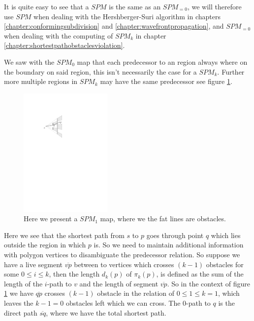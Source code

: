 It is quite easy to see that a $SPM$ is the same as an $SPM_{=0}$, we will therefore use $SPM$ when 
dealing with the Hershberger-Suri algorithm in chapters \ref{chapter:conformingsubdivision} and 
\ref{chapter:wavefrontpropagation}, and $SPM_{=0}$ when dealing with the computing of $SPM_k$ in
chapter \ref{chapter:shortestpathobstaclesviolation}.

We saw with the $SPM_0$ map that each predecessor to an region always where on the boundary on said
region, this isn't necessarily the case for a $SPM_k$. Further more multiple regions in $SPM_k$ may 
have the same predecessor see figure \ref{fig:1predecessor}.

\begin{figure}[H] 
	\centering
	\includegraphics[width=0.4\textwidth]{figures/1predecessor.pdf}
	\caption{Here we present a $SPM_1$ map, where we the fat lines are obstacles.}
	\label{fig:1predecessor} 
\end{figure}

Here we see that the shortest path from $s$ to $p$ goes through point $q$ which lies outside the region
in which $p$ is. So we need to maintain additional information with polygon vertices to disambiguate the 
predecessor relation. So suppose we have a live segment $\overline{vp}$ between to vertices which crosses
$(k-1)$ obstacles for some $0 \leq i \leq k$, then the length $d_k(p)$ of $\pi_k(p)$, is defined as
the sum of the length of the $i$-path to $v$ and the length of segment $\overline{vp}$. So in the context
of figure \ref{fig:1predecessor}  we have $\overline{qp}$ crosses $(k-1)$ obstacle in the relation of $0 \leq
1 \leq k = 1$, which leaves the $k - 1 = 0$ obstacles left which we can cross. The $0$-path to $q$ is the
direct path $\overline{sq}$, where we have the total shortest path.

